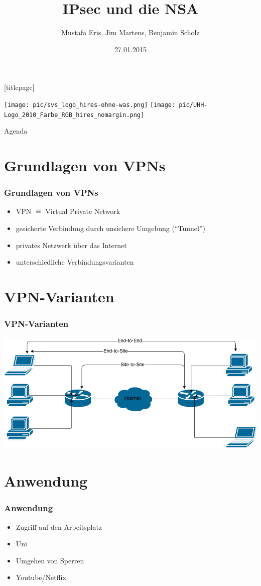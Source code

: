 \documentclass[t]{beamer}
\title{IPsec und die NSA}
\author[Eris, Martens, Scholz]{Mustafa Eris, Jim Martens, Benjamin Scholz}
\institute[Uni Hamburg]{Universität Hamburg\\ Fachbereich Informatik}
\date{27.01.2015}
\begin{document}
\begingroup
	[titlepage]
	\begin{frame}[plain]
		\vskip8mm
		\texttt{[image: pic/svs\_logo\_hires-ohne-was.png]}
		\vskip-20mm %
		\titlepage
		\vspace{\fill}
		\texttt{[image: pic/UHH-Logo\_2010\_Farbe\_RGB\_hires\_nomargin.png]}
		\vskip20pt
	\end{frame}
\endgroup

\begin{frame}{Agenda}
	\tableofcontents
\end{frame}

\section{Grundlagen von VPNs}
\begin{frame}
	\frametitle{Grundlagen von VPNs}
	\begin{itemize}
		\vfill
		\item VPN \(\widehat{=}\) Virtual Private Network
		\vfill
		\item gesicherte Verbindung durch unsichere Umgebung ("`Tunnel"')
		\vfill
		\item privates Netzwerk über das Internet
		\vfill
		\item unterschiedliche Verbindungsvarianten
		\vfill
	\end{itemize}
\end{frame}

\section{VPN-Varianten}
\begin{frame}
	\frametitle{VPN-Varianten}
	\vfill
	\includegraphics[width=1\textwidth]{pic/ipsec.png}
\end{frame}

\section{Anwendung}
\begin{frame}
	\frametitle{Anwendung}
	\begin{itemize}
		\vfill
		\item Zugriff auf den Arbeitsplatz
		\vfill
		\item Uni
		\vfill
		\item Umgehen von Sperren
		\vfill
		\item Youtube/Netflix
	\end{itemize}
\end{frame}
\end{document}
